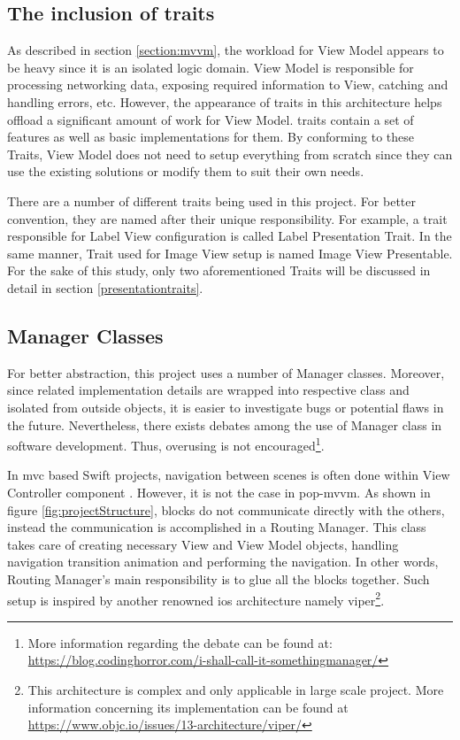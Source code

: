 \documentclass[11pt,a4paper,oneside,article]{memoir}
\begin{document}
\subsection{The inclusion of \glspl{trait}}
 As described in section \ref{section:mvvm}, the workload for View Model appears to be heavy since it is an isolated logic domain. View Model is responsible for processing networking data, exposing required information to View, catching and handling errors, etc. However, the appearance of \glspl{trait} in this architecture helps offload a significant amount of work for View Model. \glspl{trait} contain a set of features as well as basic implementations for them. By conforming to these Traits, View Model does not need to setup everything from scratch since they can use the existing solutions or modify them to suit their own needs.

There are a number of different \glspl{trait} being used in this project. For better convention, they are named after their unique responsibility. For example, a \gls{trait} responsible for Label View configuration is called Label Presentation Trait. In the same manner, Trait used for Image View setup is named Image View Presentable. For the sake of this study, only two aforementioned Traits will be discussed in detail in section \ref{presentationtraits}.

\subsection{Manager Classes}
For better abstraction, this project uses a number of Manager classes. Moreover, since related implementation details are wrapped into respective class and isolated from outside objects, it is easier to investigate bugs or potential flaws in the future. Nevertheless, there exists debates among the use of Manager class in software development. Thus, overusing is not encouraged\footnote{More information regarding the debate can be found at: \url{https://blog.codinghorror.com/i-shall-call-it-somethingmanager/}}.

In \gls{mvc} based Swift projects, navigation between scenes is often done within View Controller component \cite{apple:mvc}. However, it is not the case in \gls{pop-mvvm}. As shown in figure \ref{fig:projectStructure}, blocks do not communicate directly with the others, instead the communication is accomplished in a Routing Manager. This class takes care of creating necessary View and View Model objects, handling navigation transition animation and performing the navigation. In other words, Routing Manager's main responsibility is to glue all the blocks together. Such setup is inspired by another renowned \gls{ios} architecture namely \gls{viper}\footnote{This architecture is complex and only applicable in large scale project. More information concerning its implementation can be found at \url{https://www.objc.io/issues/13-architecture/viper/}}.
\end{document}
